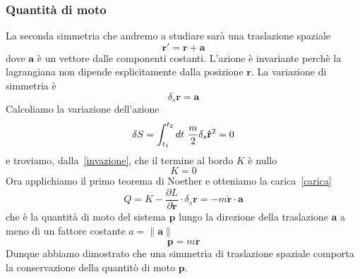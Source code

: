 \begin{example}
    \subsubsection{Quantità di moto}
        La seconda simmetria che andremo a studiare sarà una traslazione spaziale
    \begin{equation}
        \mathbf r' = \mathbf r + \mathbf a
    \end{equation}
        dove $\mathbf a$ è un vettore dalle componenti costanti. L'azione è invariante perchè la lagrangiana non dipende esplicitamente dalla posizione $\mathbf r$. La variazione di simmetria è 
    \begin{equation*}
        \delta_s \mathbf r = \mathbf a
    \end{equation*}
        Calcoliamo la variazione dell'azione
    \begin{equation}
        \delta S = \int_{t_1}^{t_2}dt~ \frac{m}{2} \delta_s \mathbf{\dot r}^2 = 0
    \end{equation}
        e troviamo, dalla~\eqref{invazione}, che il termine al bordo $K$ è nullo
    \begin{equation*}
        K = 0
    \end{equation*}
        Ora applichiamo il primo teorema di Noether e otteniamo la carica~\eqref{carica} 
    \begin{equation}
        Q = K - \frac{\partial L}{\partial \mathbf{\dot r}} \cdot \delta_s \mathbf r = - m \mathbf{\dot r} \cdot \mathbf a
    \end{equation}
        che è la quantità di moto del sistema $\mathbf p$ lungo la direzione della traslazione $\mathbf a$ a meno di un fattore costante $a = \|\mathbf a \|$
    \begin{equation*}
        \mathbf p = m \mathbf{\dot r}
    \end{equation*}
        Dunque abbiamo dimostrato che una simmetria di traslazione spaziale comporta la conservazione della quantitò di moto $\mathbf p$.


\end{example}
